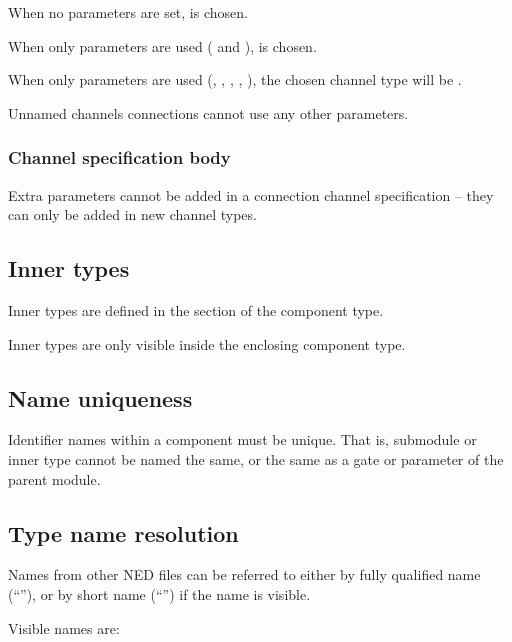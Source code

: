When no parameters are set,  is chosen.

When only  parameters are used (
and ),  is chosen.

When only  parameters are used
(, , , , ),
the chosen channel type will be .

Unnamed channels connections cannot use any other parameters.


\subsubsection{Channel specification body}

Extra parameters cannot be added in a connection channel specification --
they can only be added in new channel types.



\subsection{Inner types}
\label{ch-ned-ref:sec:inner-types}

Inner types are defined in the  section of the component type.

Inner types are only visible inside the enclosing component type.



\subsection{Name uniqueness}

Identifier names within a component must be unique. That is, submodule
or inner type cannot be named the same, or the same as a gate or
parameter of the parent module.



\subsection{Type name resolution}
\label{ch-ned-ref:sec:type-name-resolution}

Names from other NED files can be referred to either by fully qualified
name (``''), or by short name
(``'') if the name is visible.

Visible names are:


